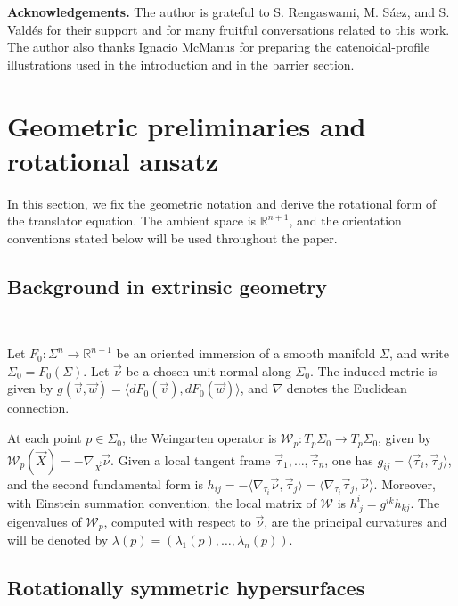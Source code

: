 \documentclass{amsart}
\theoremstyle{plain}
\theoremstyle{mainintrothm}
\theoremstyle{definition}
\begin{document}
\medskip

\noindent\textbf{Acknowledgements.}
The author is grateful to S. Rengaswami, M. S\'aez, and S. Vald\'es for their
support and for many fruitful conversations related to this work.  The author
also thanks Ignacio McManus for preparing the catenoidal-profile illustrations
used in the introduction and in the barrier section.

\section{Geometric preliminaries and rotational ansatz}
\label{sec:preliminaries}

In this section, we fix the geometric notation and derive the rotational form of
the translator equation.  The ambient space is $\mathbb R^{n+1}$, and the
orientation conventions stated below will be used throughout the paper.

\subsection{Background in extrinsic geometry}\,
\label{subsec:extrinsic-notation}

Let $F_0:\Sigma^n\to\mathbb R^{n+1}$ be an oriented immersion of a smooth
manifold $\Sigma$, and write $\Sigma_0=F_0(\Sigma)$.  Let $\vec\nu$ be a chosen
unit normal along $\Sigma_0$.  The induced metric is given by $g(\vec v,\vec w)=\langle dF_0(\vec v),dF_0(\vec w)\rangle$, and $\nabla$ denotes the Euclidean connection.

\medskip

At each point $p\in\Sigma_0$, the Weingarten operator is $\mathcal W_p:T_p\Sigma_0\to T_p\Sigma_0$, given by  $\mathcal W_p(\vec{X})=-\nabla_{\vec{X}}\vec\nu$. Given a local tangent frame $\vec\tau_1,\ldots,\vec\tau_n$, one has
$g_{ij}=\langle\vec\tau_i,\vec\tau_j\rangle$, and the second fundamental form is
$h_{ij}=-\langle\nabla_{\tau_i}\vec\nu,\vec\tau_j\rangle=\langle\nabla_{\tau_i}\vec\tau_j,\vec\nu\rangle $. Moreover, with Einstein summation convention, the local matrix of $\mathcal W$ is $h^i_{\ j}=g^{ik}h_{kj}$.  The eigenvalues of $\mathcal W_p$, computed with respect to $\vec\nu$, are the principal curvatures and will be denoted by $\lambda(p)=(\lambda_1(p),\ldots,\lambda_n(p))$.


\subsection{Rotationally symmetric hypersurfaces}\,
\label{subsec:rotational-generating-curves}
\end{document}
